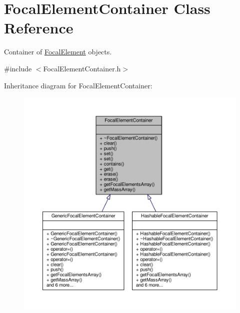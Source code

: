 \hypertarget{classFocalElementContainer}{}\section{Focal\+Element\+Container Class Reference}
\label{classFocalElementContainer}


Container of \hyperlink{classFocalElement}{Focal\+Element} objects.  




{\ttfamily \#include $<$Focal\+Element\+Container.\+h$>$}



Inheritance diagram for Focal\+Element\+Container\+:\nopagebreak
\begin{figure}[H]
\begin{center}
\leavevmode
\includegraphics[width=350pt]{classFocalElementContainer__inherit__graph}
\end{center}
\end{figure}


